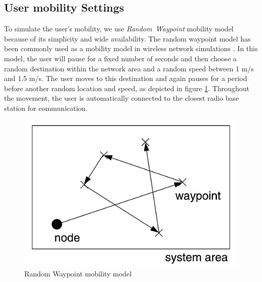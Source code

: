 \subsection{User mobility Settings}
To simulate the user's mobility, we use \textit{Random\ Waypoint} mobility model because of its simplicity and wide availability. The random waypoint model has been commonly used as a mobility model in wireless network simulations \cite{bettstetter2004stochastic}. In this model, the user will pause for a fixed number of seconds and then choose a random destination within the network area and a random speed between 1 m/s and 1.5 m/s. The user moves to this destination and again pauses for a period before another random location and speed, as depicted in figure \ref{fig:rwpmodel}. Throughout the movement,
the user is automatically connected to the closest radio base station for communication. 
\begin{figure}
	\centering
	\includegraphics[width=.9\textwidth]{figs/mobilitymodel.PNG}
	\vspace{\baselineskip}
	\caption{Random Waypoint mobility model}
		
	\label{fig:rwpmodel}
\end{figure}


